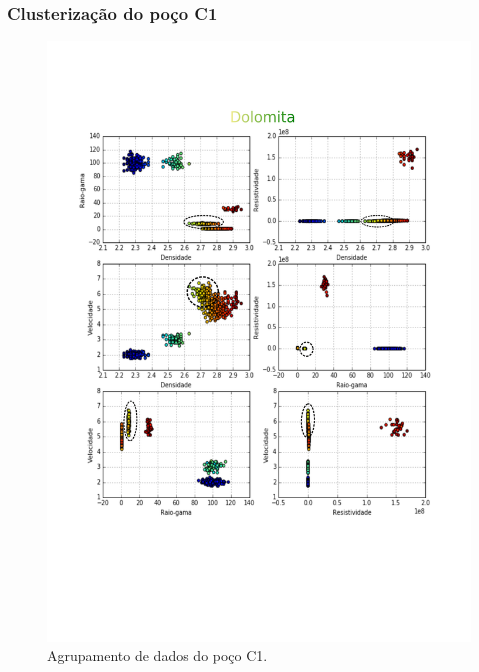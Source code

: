 \documentclass[aspectratio=10]{beamer} %
\begin{document}
\begin{frame}
\frametitle{Clusterização do poço C1}
\begin{figure}[H]
\centering
\includegraphics[scale=0.3]{Imagens/dolomitaC1.png}
\caption{Agrupamento de dados do poço C1.}
\end{figure} 
\end{frame}
\end{document}
